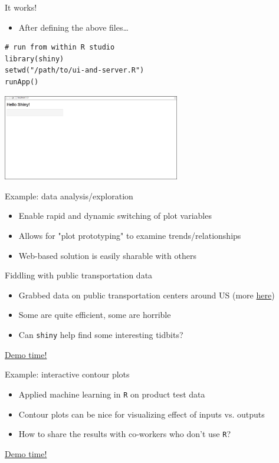 \documentclass[sans,aspectratio=169,presentation,bigger,fleqn]{beamer}
\begin{document}
\begin{frame}[fragile,label=sec-5]{It works!}
 \begin{itemize}
\item After defining the above files\ldots{}
\end{itemize}

\scriptsize
\begin{verbatim}
# run from within R studio
library(shiny)
setwd("/path/to/ui-and-server.R")
runApp()
\end{verbatim}

\begin{center}
\includegraphics[height=3.75cm]{./img/shiny-template.png}
\end{center}
\end{frame}
\begin{frame}[label=sec-6]{Example: data analysis/exploration}
\begin{itemize}
\item Enable rapid and dynamic switching of plot variables
\item Allows for "plot prototyping" to examine trends/relationships
\item Web-based solution is easily sharable with others
\end{itemize}
\end{frame}
\begin{frame}[fragile,label=sec-7]{Fiddling with public transportation data}
 \begin{itemize}
\item Grabbed data on public transportation centers around US (more \href{https://github.com/tcrug/public-transpo}{here})
\item Some are quite efficient, some are horrible
\item Can \texttt{shiny} help find some interesting tidbits?
\end{itemize}

\pause

\href{http://jwhendy.shinyapps.io/transpo-exploration/}{\alert{Demo time!}}
\end{frame}
\begin{frame}[fragile,label=sec-8]{Example: interactive contour plots}
 \begin{itemize}
\item Applied machine learning in \texttt{R} on product test data
\item Contour plots can be nice for visualizing effect of inputs vs. outputs
\item How to share the results with co-workers who don't use \texttt{R}?
\end{itemize}

\pause

\href{http://spark.rstudio.com/jwhendy/interactive-contour/}{\alert{Demo time!}}
\end{frame}
\end{document}
